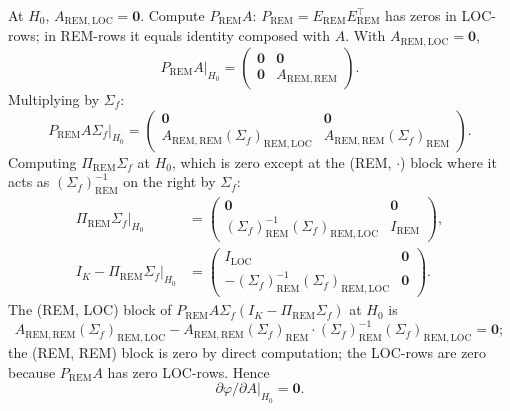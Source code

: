 \documentclass[11pt,letterpaper]{article}
\theoremstyle{remark}
\newcommand{\REM}{\mathrm{REM}}
\newcommand{\LOC}{\mathrm{LOC}}
\newcommand{\Sigmaf}{\Sigma_f}
\newcommand{\PiREM}{\Pi_{\REM}}
\newcommand{\PREM}{P_{\REM}}
\begin{document}
At $H_0$, $A_{\REM, \LOC} = \mathbf{0}$. Compute $\PREM A$: $\PREM = E_\REM E_\REM^\top$ has zeros in LOC-rows; in REM-rows it equals identity composed with $A$. With $A_{\REM, \LOC} = \mathbf{0}$,
\begin{equation*}
\PREM A \big|_{H_0} = \begin{pmatrix} \mathbf{0} & \mathbf{0} \\ \mathbf{0} & A_{\REM, \REM} \end{pmatrix}.
\end{equation*}
Multiplying by $\Sigmaf$:
\begin{equation*}
\PREM A \Sigmaf \big|_{H_0} = \begin{pmatrix} \mathbf{0} & \mathbf{0} \\ A_{\REM, \REM} (\Sigmaf)_{\REM, \LOC} & A_{\REM, \REM} (\Sigmaf)_\REM \end{pmatrix}.
\end{equation*}
Computing $\PiREM \Sigmaf$ at $H_0$, which is zero except at the (REM, $\cdot$) block where it acts as $(\Sigmaf)_\REM^{-1}$ on the right by $\Sigmaf$:
\begin{align*}
\PiREM \Sigmaf \big|_{H_0} &= \begin{pmatrix} \mathbf{0} & \mathbf{0} \\ (\Sigmaf)_\REM^{-1} (\Sigmaf)_{\REM, \LOC} & I_\REM \end{pmatrix}, \\
I_K - \PiREM \Sigmaf \big|_{H_0} &= \begin{pmatrix} I_\LOC & \mathbf{0} \\ -(\Sigmaf)_\REM^{-1} (\Sigmaf)_{\REM, \LOC} & \mathbf{0} \end{pmatrix}.
\end{align*}
The (REM, LOC) block of $\PREM A \Sigmaf (I_K - \PiREM \Sigmaf)$ at $H_0$ is
\begin{equation*}
A_{\REM, \REM} (\Sigmaf)_{\REM, \LOC} - A_{\REM, \REM} (\Sigmaf)_\REM \cdot (\Sigmaf)_\REM^{-1} (\Sigmaf)_{\REM, \LOC} = \mathbf{0};
\end{equation*}
the (REM, REM) block is zero by direct computation; the LOC-rows are zero because $\PREM A$ has zero LOC-rows. Hence
\begin{equation*}
\partial \varphi / \partial A \big|_{H_0} = \mathbf{0}.
\end{equation*}
\end{document}
